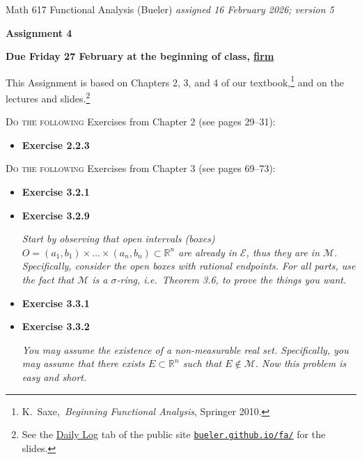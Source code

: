 \documentclass[12pt]{amsart}
\newcommand{\cE}{\mathcal{E}}
\newcommand{\cM}{\mathcal{M}}
\newcommand{\RR}{\mathbb{R}}
\begin{document}
\scriptsize \noindent Math 617 Functional Analysis (Bueler) \hfill \emph{assigned 16 February 2026; {\color{red} version 5}}
\normalsize\medskip

\Large\centerline{\textbf{Assignment 4}}
\large
\medskip

\centerline{\textbf{Due Friday 27 February at the beginning of class, \underline{firm}}}
\medskip
\normalsize

\thispagestyle{empty}

\bigskip
\noindent This Assignment is based on Chapters 2, 3, and 4 of our textbook,\footnote{K.~Saxe,~\emph{Beginning Functional Analysis}, Springer 2010.} and on the lectures and slides.\footnote{See the \href{https://bueler.github.io/fa/daily.html}{Daily Log} tab of the public site \href{https://bueler.github.io/fa/index.html}{\texttt{bueler.github.io/fa/}} for the slides.}


\newcommand{\augment}[1]{\quad\,\strut \begin{minipage}[t]{0.7\textwidth} \emph{#1}\end{minipage}}
\newcommand{\augpart}[1]{\emph{\textbf{(#1)}}}

\bigskip
\noindent \textsc{Do the following} Exercises from Chapter 2 (see pages 29--31):

\begin{itemize}
\item \textbf{Exercise 2.2.3}
\end{itemize}

\bigskip
\noindent \textsc{Do the following} Exercises from Chapter 3 (see pages 69--73):

\begin{itemize}
\item \textbf{Exercise 3.2.1}
\item \textbf{Exercise 3.2.9}  \augment{Start by observing that open intervals (boxes) $O=(a_1,b_1)\times \dots \times (a_n,b_n) \subset \RR^n$ are already in $\cE$, thus they are in $\cM$.  Specifically, consider the open boxes with rational endpoints.  For all parts, use the fact that $\cM$ is a $\sigma$-ring, i.e.~Theorem 3.6, to prove the things you want.}
\item \textbf{Exercise 3.3.1}
\item \textbf{Exercise 3.3.2}  \augment{You may assume the existence of a non-measurable real set.  Specifically, you may assume that there exists $E\subset \RR^n$ such that $E\notin\cM$.  Now this problem is easy and short.}
\end{itemize}
\end{document}
